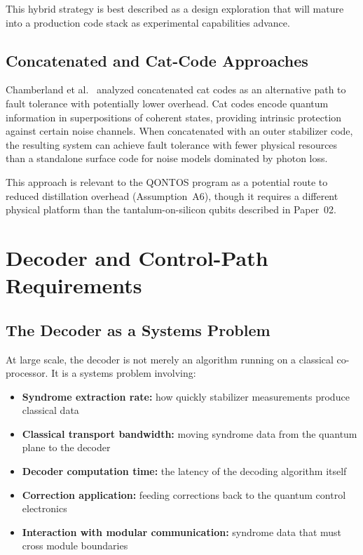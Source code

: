 \documentclass[conference]{IEEEtran}
\begin{document}
This hybrid strategy is best described as a design exploration that will mature into a production code stack as experimental capabilities advance.

\subsection{Concatenated and Cat-Code Approaches}

Chamberland et al.~\cite{chamberland2022} analyzed concatenated cat codes as an alternative path to fault tolerance with potentially lower overhead. Cat codes encode quantum information in superpositions of coherent states, providing intrinsic protection against certain noise channels. When concatenated with an outer stabilizer code, the resulting system can achieve fault tolerance with fewer physical resources than a standalone surface code for noise models dominated by photon loss.

This approach is relevant to the QONTOS program as a potential route to reduced distillation overhead (Assumption~A6), though it requires a different physical platform than the tantalum-on-silicon qubits described in Paper~02.

\section{Decoder and Control-Path Requirements}

\subsection{The Decoder as a Systems Problem}

At large scale, the decoder is not merely an algorithm running on a classical co-processor. It is a systems problem involving:

\begin{itemize}
\item \textbf{Syndrome extraction rate:} how quickly stabilizer measurements produce classical data
\item \textbf{Classical transport bandwidth:} moving syndrome data from the quantum plane to the decoder
\item \textbf{Decoder computation time:} the latency of the decoding algorithm itself
\item \textbf{Correction application:} feeding corrections back to the quantum control electronics
\item \textbf{Interaction with modular communication:} syndrome data that must cross module boundaries
\end{itemize}
\end{document}
